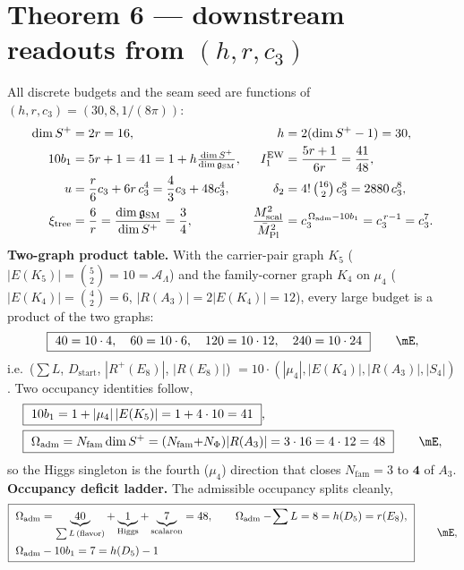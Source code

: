 \documentclass[11pt,a4paper]{article}
\newcommand{\Mbar}{\bar M_{\mathrm{Pl}}}
\newcommand{\Nfam}{N_{\mathrm{fam}}}
\newcommand{\Oadm}{\Omega_{\mathrm{adm}}}
\newcommand{\cthree}{c_3}
\newcommand{\useed}{u}
\newcommand{\dtwo}{\delta_2}
\newcommand{\AL}{\mathcal A_\Lambda}
\newcommand{\dimg}{\dim\mathfrak g_{\mathrm{SM}}}
\theoremstyle{definition}
\begin{document}
\section*{Theorem 6 --- downstream readouts from $(h,r,\cthree)$}
All discrete budgets and the seam seed are functions of $(h,r,\cthree)=(30,8,1/(8\pi))$:
\begin{align}
  \dim S^+&=2r=16, & h&=2(\dim S^+-1)=30, \\
  10b_1&=5r+1=41=1+h\tfrac{\dim S^+}{\dimg}, & I_1^{\mathrm{EW}}&=\frac{5r+1}{6r}=\frac{41}{48}, \\
  \useed&=\frac{r}{6}\cthree+6r\,\cthree^4=\frac43\cthree+48\cthree^4, &
  \dtwo&=4!\,\tbinom{16}{2}\,\cthree^8=2880\,\cthree^8, \\
  \xi_{\mathrm{tree}}&=\frac{6}{r}=\frac{\dimg}{\dim S^+}=\frac34, &
  \frac{M_{\mathrm{scal}}^2}{\Mbar^2}&=\cthree^{\,\Oadm-10b_1}=\cthree^{\,r-1}=\cthree^7 .
\end{align}
\textbf{Two-graph product table.} With the carrier-pair graph $K_5$ ($|E(K_5)|=\binom52=10=\AL$) and
the family-corner graph $K_4$ on $\mu_4$ ($|E(K_4)|=\binom42=6$, $|R(A_3)|=2|E(K_4)|=12$), every large
budget is a product of the two graphs:
\begin{equation}
  \boxed{\ 40=10\cdot4,\quad 60=10\cdot6,\quad 120=10\cdot12,\quad 240=10\cdot24\ }\qquad\mE ,
\end{equation}
i.e.\ ($\sum L$, $D_{\mathrm{start}}$, $|R^+(E_8)|$, $|R(E_8)|$) $=10\cdot(|\mu_4|,|E(K_4)|,|R(A_3)|,|S_4|)$.
Two occupancy identities follow,
\begin{equation}
\begin{aligned}
  &\boxed{\ 10b_1=1+|\mu_4|\,|E(K_5)|=1+4\cdot10=41\ },\\
  &\boxed{\ \Oadm=\Nfam\dim S^+=(\Nfam{+}N_\Phi)|R(A_3)|=3\cdot16=4\cdot12=48\ }\qquad\mE ,
\end{aligned}
\end{equation}
so the Higgs singleton is the fourth ($\mu_4$) direction that closes $\Nfam=3$ to $\mathbf 4$ of $A_3$.
\textbf{Occupancy deficit ladder.} The admissible occupancy splits cleanly,
\begin{equation}
  \boxed{\ \begin{aligned}
    &\Oadm=\underbrace{40}_{\sum L\,(\text{flavor})}+\underbrace{1}_{\text{Higgs}}+\underbrace{7}_{\text{scalaron}}=48,\qquad
    \Oadm-\!\sum L=8=h(D_5)=r(E_8),\\
    &\Oadm-10b_1=7=h(D_5)-1
  \end{aligned}\ }\qquad\mE ,
\end{equation}
\end{document}
